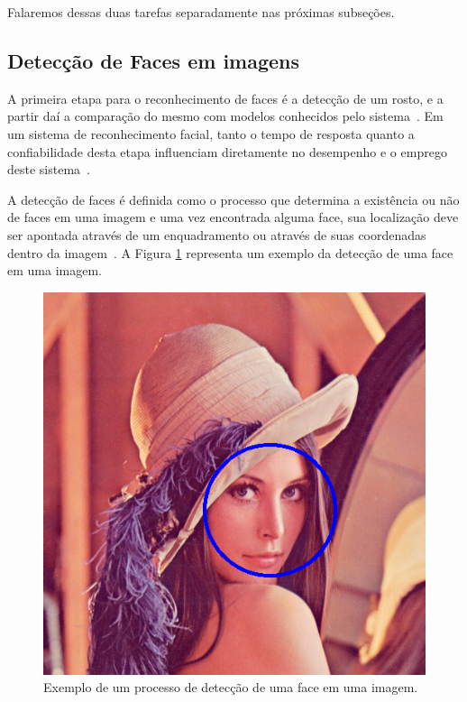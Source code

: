 Falaremos dessas duas tarefas separadamente nas próximas subseções.


\subsection{Detecção de Faces em imagens}
	
A primeira etapa para o reconhecimento de faces é a detecção de um rosto, e a partir daí a comparação do mesmo com modelos conhecidos pelo sistema~\cite{hong, oliveira}. Em um sistema de reconhecimento facial, tanto o tempo de resposta quanto a confiabilidade desta etapa influenciam diretamente no desempenho e o emprego deste sistema~\cite{oliveira}.

A detecção de faces é definida como o processo que determina a existência ou não de faces em uma imagem e uma vez encontrada alguma face, sua localização deve ser apontada através de um enquadramento ou através de suas coordenadas dentro da imagem~\cite{oliveira}. A Figura \ref{enquadramentoRosto} representa um exemplo da detecção de uma face em uma imagem.

	\begin{figure}[hbt]
		\begin{center}
			\includegraphics[scale=0.5]{figuras/2.FundamentacaoTeorica/enquadramentoRosto.png}
		\end{center}
		\caption{Exemplo de um processo de detecção de uma face em uma imagem.}
		\label{enquadramentoRosto}
	\end{figure}


